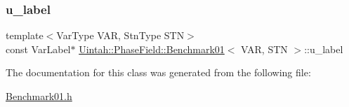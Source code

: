 \subsubsection{\texorpdfstring{u\+\_\+label}{u\_label}}
{\footnotesize\ttfamily template$<$Var\+Type V\+AR, Stn\+Type S\+TN$>$ \\
const Var\+Label$\ast$ \hyperlink{classUintah_1_1PhaseField_1_1Benchmark01}{Uintah\+::\+Phase\+Field\+::\+Benchmark01}$<$ V\+AR, S\+TN $>$\+::u\+\_\+label\hspace{0.3cm}{\ttfamily [protected]}}



The documentation for this class was generated from the following file\+:\begin{DoxyCompactItemize}
\item 
\hyperlink{Benchmark01_8h}{Benchmark01.\+h}\end{DoxyCompactItemize}
